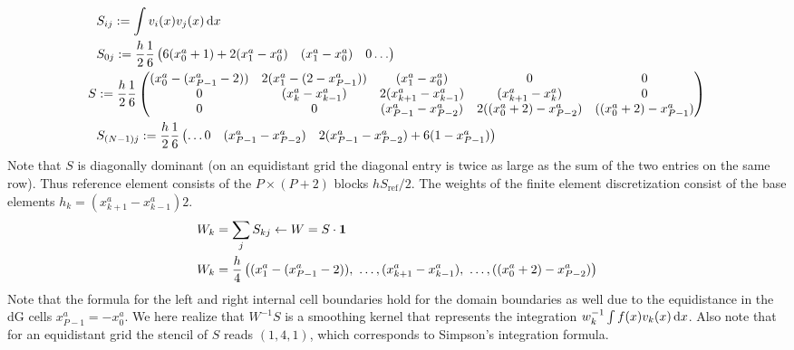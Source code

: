 \begin{align}
    &S_{ij} := \int v_i(x)v_j(x)\,\mathrm{d}x\\
    &S_{0j} := \frac{h}{2} \frac{1}{6}\begin{pmatrix}
        6(x^a_0+1) + 2(x^a_1-x^a_0) & (x^a_1-x^a_0) & 0 \ldots
    \end{pmatrix}
    \nonumber\\
    S &:= \frac{h}{2}\frac{1}{6}\begin{pmatrix}
        (x^a_0-(x^a_{P-1}-2)) & 2(x^a_1 - (2-x^a_{P-1})) & (x^a_1 - x^a_0) & 0 & 0 \\
        0 & (x^a_{k} - x^a_{k-1}) & 2(x^a_{k+1}-x^a_{k-1}) & (x^a_{k+1} - x^a_k) & 0 \\
        0 & 0 & (x^a_{P-1} - x^a_{P-2}) & 2( (x^a_0+2) - x^a_{P-2}) & ((x^a_0+2)- x^a_{P-1})
    \end{pmatrix}
    \nonumber\\
    &S_{(N-1)j} := \frac{h}{2} \frac{1}{6}\begin{pmatrix}
        \ldots 0 &(x^a_{P-1} - x^a_{P-2}) & 2(x^a_{P-1} - x^a_{P-2}) + 6( 1 - x^a_{P-1})
    \end{pmatrix}
\end{align}
Note that $S$ is diagonally dominant (on an equidistant grid the diagonal entry is twice as large as the sum of the two entries on the same row).
Thus reference element consists of the $P\times(P+2)$ blocks $hS_{\text{ref}}/2$.
The weights of the finite element discretization consist of the base elements
$h_k = (x^a_{k+1}-x^a_{k-1})2$.
\begin{align} \label{eq:fem_weights}
    W_k &= \sum_j S_{kj}\leftarrow W = S\cdot \mathbf{1} \\
    W_k &= \frac{h}{4}\left( (x^a_1 - (x^a_{P-1}-2)),\ \ldots, (x^a_{k+1}-x^a_{k-1}),\ \ldots, ( (x^a_0+2) - x^a_{P-2})\right)
\end{align}
Note that the formula for the left and right internal cell boundaries hold for the domain boundaries as well
due to the equidistance in the dG cells $x^a_{P-1} = -x^a_0 $.
We here realize that $W^{-1}S$  is a smoothing kernel that represents the
integration $w_k^{-1} \int f(x) v_k(x)\,\mathrm{d}x$.
Also note that for an equidistant grid the stencil of $S$ reads $(1,4,1)$, which
corresponds to Simpson's integration formula.

